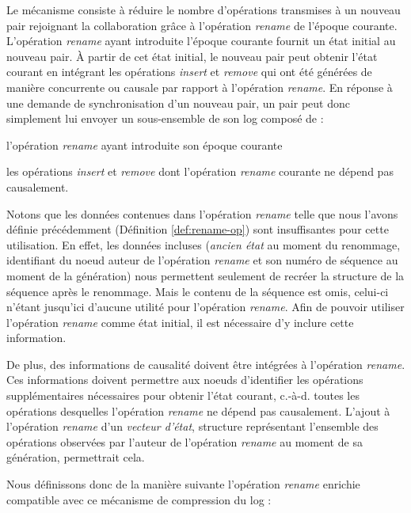 \documentclass[12pt]{thesul}
\newcommand{\ie}{c.-à-d. }
\begin{document}
Le mécanisme consiste à réduire le nombre d'opérations transmises à un nouveau pair rejoignant la collaboration grâce à l'opération \emph{rename} de l'époque courante.
L'opération \emph{rename} ayant introduite l'époque courante fournit un état initial au nouveau pair.
À partir de cet état initial, le nouveau pair peut obtenir l'état courant en intégrant les opérations \emph{insert} et \emph{remove} qui ont été générées de manière concurrente ou causale par rapport à l'opération \emph{rename}.
En réponse à une demande de synchronisation d'un nouveau pair, un pair peut donc simplement lui envoyer un sous-ensemble de son log composé de :
\begin{enumerate*}[label=(\roman*)]
  \item l'opération \emph{rename} ayant introduite son époque courante
  \item les opérations \emph{insert} et \emph{remove} dont l'opération \emph{rename} courante ne dépend pas causalement.
\end{enumerate*}

Notons que les données contenues dans l'opération \emph{rename} telle que nous l'avons définie précédemment (Définition \autoref{def:rename-op}) sont insuffisantes pour cette utilisation.
En effet, les données incluses (\emph{ancien état} au moment du renommage, identifiant du noeud auteur de l'opération \emph{rename} et son numéro de séquence au moment de la génération) nous permettent seulement de recréer la structure de la séquence après le renommage.
Mais le contenu de la séquence est omis, celui-ci n'étant jusqu'ici d'aucune utilité pour l'opération \emph{rename}.
Afin de pouvoir utiliser l'opération \emph{rename} comme état initial, il est nécessaire d'y inclure cette information.

De plus, des informations de causalité doivent être intégrées à l'opération \emph{rename}.
Ces informations doivent permettre aux noeuds d'identifier les opérations supplémentaires nécessaires pour obtenir l'état courant, \ie toutes les opérations desquelles l'opération \emph{rename} ne dépend pas causalement.
L'ajout à l'opération \emph{rename} d'un \emph{vecteur d'état}, structure représentant l'ensemble des opérations observées par l'auteur de l'opération \emph{rename} au moment de sa génération, permettrait cela.

Nous définissons donc de la manière suivante l'opération \emph{rename} enrichie compatible avec ce mécanisme de compression du log :
\end{document}
